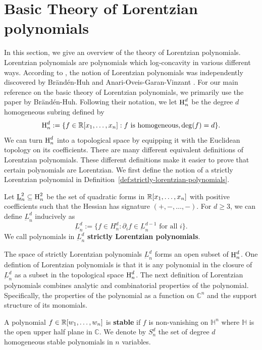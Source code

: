\documentclass{puthesis-UG}
\begin{document}
\section{Basic Theory of Lorentzian polynomials} \label{sec:lorentzian-polynomials}

In this section, we give an overview of the theory of Lorentzian polynomials. Lorentzian polynomials are polynomials which log-concavity in various different ways. According to \cite{baker_2022}, the notion of Lorentzian polynomials was independently discovered by Brändén-Huh \cite{lorentzian-polynomials} and Anari-Oveis-Garan-Vinzant \cite{anari2018logconcave}. For our main reference on the basic theory of Lorentzian polynomials, we primarily use the paper \cite{lorentzian-polynomials} by Brändén-Huh. Following their notation, we let $\operatorname{H}_n^d$ be the degree $d$ homogeneous subring defined by 
\[
	\operatorname{H}_n^d := \{f \in \mathbb{R}[x_1, \ldots, x_n] : \text{$f$ is homogeneous,} \deg (f) = d\}.
\] 
We can turn $\operatorname{H}_n^d$ into a topological space by equipping it with the Euclidean topology on its coefficients. There are many different equivalent definitions of Lorentzian polynomials. These different definitions make it easier to prove that certain polynomials are Lorentzian. We first define the notion of a strictly Lorentzian polynomial in Definition~\ref{def:strictly-lorentzian-polynomials}. 

\begin{defn} \label{def:strictly-lorentzian-polynomials}
	Let $\underbar{L}_n^2 \subseteq \operatorname{H}_n^2$ be the set of quadratic forms in $\mathbb{R}[x_1, \ldots, x_n]$ with positive coefficients such that the Hessian has signature $(+, -, \ldots, -)$. For $d \geq 3$, we can define $\underbar{L}_n^d$ inducively as
	\[
		\underbar{L}_n^d := \{f \in H_n^d : \partial_i f \in \underbar{L}_n^{d-1} \text{ for all $i$}\}.
	\] 
	We call polynomials in $\underbar{L}_n^d$ \textbf{strictly Lorentzian polynomials}. 
\end{defn}

The space of strictly Lorentzian polynomials $\underbar{L}_n^d$ forms an open subset of $\operatorname{H}_n^d$. One defintion of Lorentzian polynomials is that it is any polynomial in the closure of $\underbar{L}_n^d$ as a subset in the topological space $\operatorname{H}_n^d$. The next definition of Lorentzian polynomials combines analytic and combinatorial properties of the polynomial. Specifically, the properties of the polynomial as a function on $\mathbb{C}^n$ and the support structure of its monomials. 

\begin{defn} \label{def:stable-polynomial}
	A polynomial $f \in \mathbb{R}[w_1, \ldots, w_n]$ is \textbf{stable} if $f$ is non-vanishing on $\mathbb{H}^n$ where $\mathbb{H}$ is the open upper half plane in $\mathbb{C}$. We denote by $S_n^d$ the set of degree $d$ homogeneous stable polynomials in $n$ variables. 
\end{defn}
\end{document}

